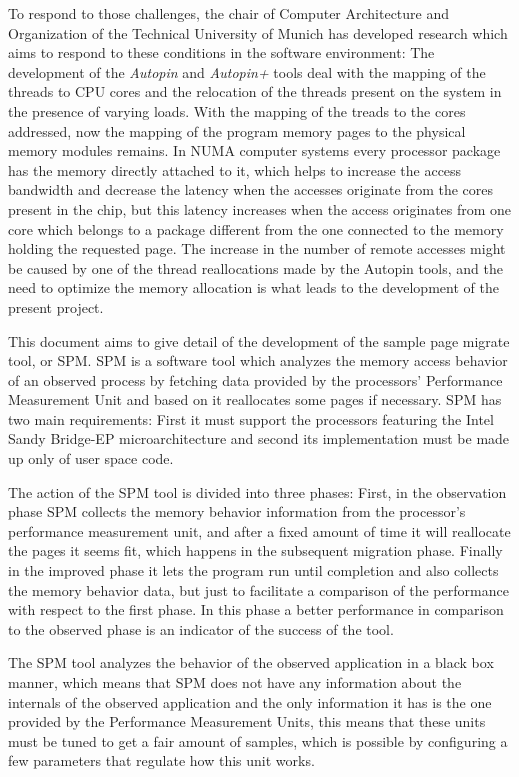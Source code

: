 To respond to those challenges, the chair of Computer Architecture and Organization of the Technical University of Munich has developed research which aims to respond to these conditions in the software environment: The development of the \textit{Autopin} and \textit{Autopin+} tools deal with the mapping of the threads to CPU cores and the relocation of the threads present on the system in the presence of varying loads. 
With the mapping of the treads to the cores addressed, now the mapping of the program memory pages to the physical memory modules remains. In NUMA computer systems every processor package has the memory directly attached to it, which helps to increase the access bandwidth and decrease the latency when the accesses originate from the cores present in the chip, but this latency increases when the access originates from one core which belongs to a package different from the one connected to the memory holding the requested page.  The increase in the number of remote accesses might be caused by one of the thread reallocations made by the Autopin tools, and the need to optimize the memory allocation is what leads to the development of the present project.

This document aims to give detail of the development of the sample page migrate tool, or SPM. SPM is a software tool which analyzes the memory access behavior of an observed process by fetching data provided by the processors’ Performance Measurement Unit and based on it reallocates some pages if necessary. SPM has two main requirements: First it must support the processors featuring the Intel Sandy Bridge-EP microarchitecture and second its implementation must be made up only of user space code.

The action of the SPM tool is divided into three phases: First, in the observation phase SPM collects the memory behavior information from the processor’s performance measurement unit, and after a fixed amount of time it will reallocate the pages it seems fit, which happens in the subsequent migration phase. Finally in the improved phase it lets the program run until completion and also collects the memory behavior data, but just to facilitate a comparison of the performance with respect to the first phase. In this phase a better performance in comparison to the observed phase is an indicator of the success of the tool.

The SPM tool analyzes the behavior of the observed application in a black box manner, which means that SPM does not have any information about the internals of the observed application and the only information it has is the one provided by the Performance Measurement Units, this means that these units must be tuned to get a fair amount of samples, which is possible by configuring a few parameters that regulate how this unit works.

